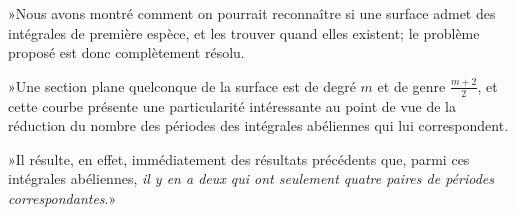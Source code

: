\documentclass{article}
\begin{document}
»Nous avons montré comment on pourrait reconnaître si une surface admet des intégrales de première espèce, et les trouver quand elles existent; le problème proposé est donc complètement résolu.

»Une section plane quelconque de la surface est de degré $m$ et de
genre $\frac{m + 2}{2}$, et cette courbe présente une particularité intéressante au point de vue de la réduction du nombre des périodes des intégrales abéliennes qui lui correspondent.

»Il résulte, en effet, immédiatement des résultats précédents que, parmi ces intégrales abéliennes, \emph{il y en a deux qui ont seulement quatre paires de périodes correspondantes}.»
\end{document}
